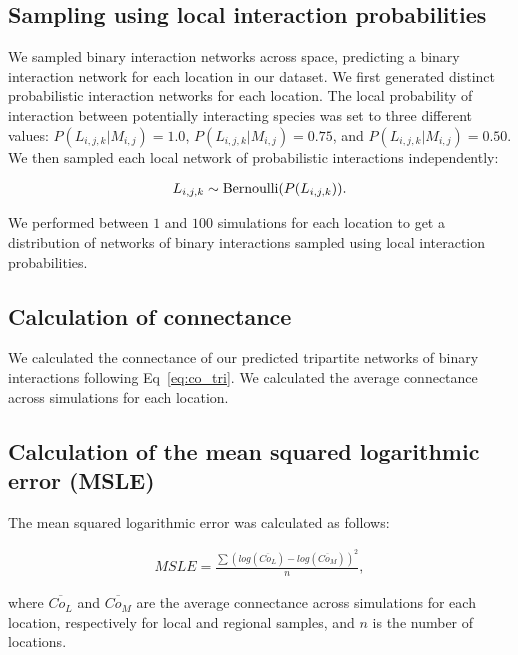 \begin{refsection}
\subsection{Sampling using local interaction probabilities}

We sampled binary interaction networks across space, predicting a binary
interaction network for each location in our dataset. We first generated
distinct probabilistic interaction networks for each location. The local
probability of interaction between potentially interacting species was set to
three different values: $P(L_{i, j, k}|M_{i, j}) = 1.0$, $P(L_{i, j, k}|M_{i,
j}) = 0.75$, and $P(L_{i, j, k}|M_{i, j}) = 0.50$. We then sampled each local
network of probabilistic interactions independently: 

\begin{eqnarray}
    \label{eq:sample2_sup}
    L_{i, j, k} \sim {\rm Bernoulli}(P(L_{i, j, k})).
\end{eqnarray}

We performed between $1$ and $100$ simulations for each location to get a
distribution of networks of binary interactions sampled using local interaction
probabilities. 

\subsection{Calculation of connectance}

We calculated the connectance of our predicted tripartite networks of binary
interactions following Eq~\ref{eq:co_tri}. We calculated the average connectance
across simulations for each location.

\subsection{Calculation of the mean squared logarithmic error (MSLE)}

The mean squared logarithmic error was calculated as follows: 

\begin{eqnarray}
    \label{eq:MSLE_sup}
    MSLE = \frac{\sum (log(\overline{Co_L}) - log(\overline{Co_M}))^2}{n},
\end{eqnarray}

where $\overline{Co_L}$ and $\overline{Co_M}$ are the average connectance across
simulations for each location, respectively for local and regional samples, and
$n$ is the number of locations.

\clearpage


\begingroup
\let\cleardoublepage\clearpage
\printbibliography
\endgroup
\end{refsection}


\endinput
